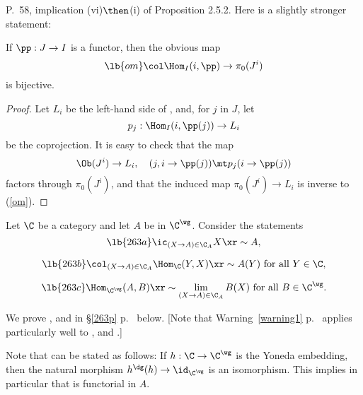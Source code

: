 \documentclass[12pt]{article}
\theoremstyle{remark}
\theoremstyle{definition}
\begin{document}
\begin{s} 
P.~58, implication (vi)$\then$(i) of Proposition 2.5.2. Here is a slightly stronger statement:

\begin{prop} 
If $\pp:J\to I$ is a functor, then the obvious map
\begin{equation}\lb{om}
\col\Hom_I(i,\pp)\to\pi_0(J^i)
\end{equation}
is bijective. 
\end{prop}

\begin{proof} 
Let $L_i$ be the left-hand side of , and, for $j$ in $J$, let 
$$
p_j:\Hom_I(i,\pp(j))\to L_i
$$
be the coprojection. It is easy to check that the map 
$$
\Ob(J^i)\to L_i,\quad(j,i\to\pp(j))\mt p_j(i\to\pp(j))
$$
factors through $\pi_0(J^i)$, and that the induced map $\pi_0(J^i)\to L_i$ is inverse to (\ref{om}). %
\end{proof}
\end{s}

%


Let $\C$ be a category and let $A$ be in $\C^\wg$. Consider the statements
\begin{equation}\lb{263a}
\ic_{(X\to A)\in\C_A}X\xr\sim A,
\end{equation} 

\begin{equation}\lb{263b}
\col_{(X\to A)\in\C_A}\Hom_\C(Y,X)\xr\sim A(Y)\text{ for all }Y\in\C, 
\end{equation}

\begin{equation}\lb{263c}
\Hom_{\C^\wg}(A,B)\xr\sim\lim_{(X\to A)\in\C_A}B(X)\text{ for all }B\in\C^\wg. 
\end{equation}

We prove ,  and  in \S\ref{263p} p.~ below. [Note that Warning~\ref{warning1} p.~ applies particularly well to ,  and .] %

Note that  can be stated as follows: If $h:\C\to\C^\wg$ is the Yoneda embedding, then the natural morphism $h^\dg(h)\to\id_{\C^\wg}$ is an isomorphism. This implies in particular that  is functorial in $A$.
\end{document}
